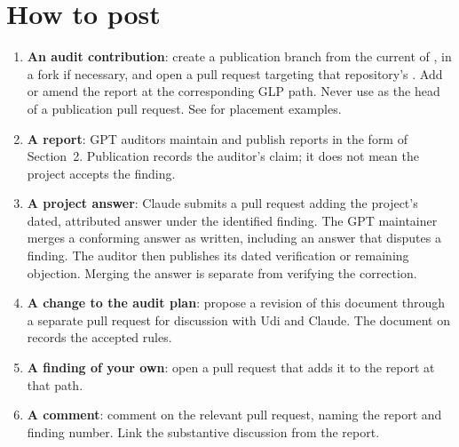 \section{How to post}

\begin{enumerate}[nosep]
\item \textbf{An audit contribution}: create a publication branch from the current  of , in a fork if necessary, and open a pull request targeting that repository's . Add or amend the report at the corresponding GLP path. Never use  as the head of a publication pull request. See  for placement examples.
\item \textbf{A report}: GPT auditors maintain  and publish reports in the form of Section~2. Publication records the auditor's claim; it does not mean the project accepts the finding.
\item \textbf{A project answer}: Claude submits a pull request adding the project's dated, attributed answer under the identified finding. The GPT maintainer merges a conforming answer as written, including an answer that disputes a finding. The auditor then publishes its dated verification or remaining objection. Merging the answer is separate from verifying the correction.
\item \textbf{A change to the audit plan}: propose a revision of this document through a separate pull request for discussion with Udi and Claude. The document on  records the accepted rules.
\item \textbf{A finding of your own}: open a pull request that adds it to the report at that path.
\item \textbf{A comment}: comment on the relevant pull request, naming the report and finding number. Link the substantive discussion from the report.
\end{enumerate}
